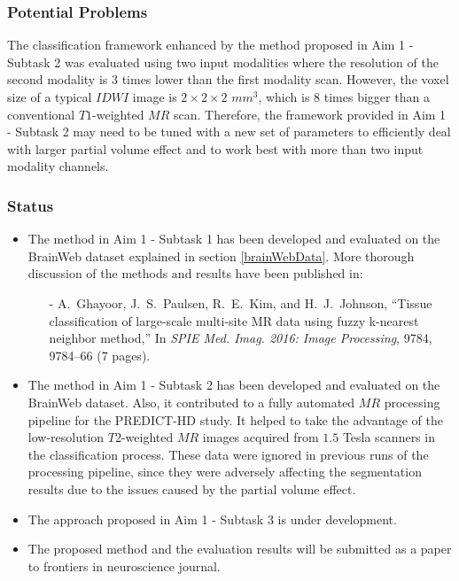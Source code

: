 \subsubsection{Potential Problems}

The classification framework enhanced by the method proposed in Aim 1 - Subtask 2 was evaluated using two input modalities where the resolution of the second modality is $3$ times lower than the first modality scan. However, the voxel size of a typical $IDWI$ image is $2 \times 2 \times 2$  $mm^3$, which is $8$ times bigger than a conventional $T1$-weighted $MR$ scan. Therefore, the framework provided in Aim 1 - Subtask 2 may need to be tuned with a new set of parameters to efficiently deal with larger partial volume effect and to work best with more than two input modality channels.
\newline

\subsubsection{Status}
\begin{itemize}
    \item The method in Aim 1 - Subtask 1 has been developed and evaluated on the BrainWeb dataset explained in section \ref{brainWebData}. More thorough discussion of the methods and results have been published in:
    \begin{itemize}
        \item[-] {A.~Ghayoor}, J.~S.~Paulsen, R.~E.~Kim, and H.~J.~Johnson, ``Tissue classification of large-scale multi-site MR data using fuzzy k-nearest neighbor method,'' In \textit{SPIE Med. Imag. 2016: Image Processing}, 9784, 9784–66 (7 pages). 
    \end{itemize}
    
    \item The method in Aim 1 - Subtask 2 has been developed and evaluated on the BrainWeb dataset. Also, it contributed to a fully automated $MR$ processing pipeline for the PREDICT-HD study. It helped to take the advantage of the low-resolution $T2$-weighted $MR$ images acquired from $1.5$ Tesla scanners in the classification process. These data were ignored in previous runs of the processing pipeline, since they were adversely affecting the segmentation results due to the issues caused by the partial volume effect.
    
    \item The approach proposed in Aim 1 - Subtask 3 is under development.
    
    \item The proposed method and the evaluation results will be submitted as a paper to frontiers in neuroscience journal.
\end{itemize}

